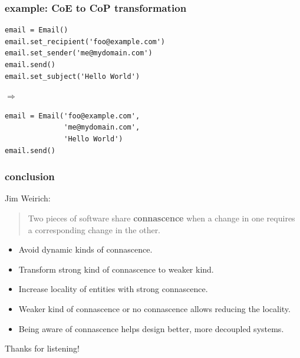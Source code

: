 \documentclass[aspectratio=169,12pt,xcolor=dvipsnames]{beamer}
\begin{document}
\begin{frame}[fragile]
  \frametitle{example: CoE to CoP transformation}
  \begin{center}
    \begin{minipage}[c]{.512\textwidth}
      \begin{verbatim}
email = Email()
email.set_recipient('foo@example.com')
email.set_sender('me@mydomain.com')
email.send()
email.set_subject('Hello World')
        \end{verbatim}
      \end{minipage}
      \begin{minipage}[c]{.03\textwidth}
        \begin{large}
          $\Rightarrow$
        \end{large}
      \end{minipage}
      \begin{minipage}[c]{.428\textwidth}
        \begin{verbatim}
email = Email('foo@example.com',
              'me@mydomain.com',
              'Hello World')
email.send()
        \end{verbatim}
      \end{minipage}
    \end{center}
\end{frame}

\begin{frame}
  \frametitle{conclusion}
  Jim Weirich:\bigskip\\
  \begin{quote}
    Two pieces of software share \textbf{connascence} when a change in one requires a corresponding change in the other.
  \end{quote}\bigskip
  \begin{center}
    \begin{itemize}
      \item Avoid dynamic kinds of connascence.
      \item Transform strong kind of connascence to weaker kind.
      \item Increase locality of entities with strong connascence.
      \item Weaker kind of connascence or no connascence allows reducing the locality.
      \item Being aware of connascence helps design better, more decoupled systems.
    \end{itemize}\bigskip
  \end{center}
\end{frame}

\begin{frame}
  \begin{center}
    \begin{huge}
      Thanks for listening!
    \end{huge}
  \end{center}
\end{frame}
\end{document}
